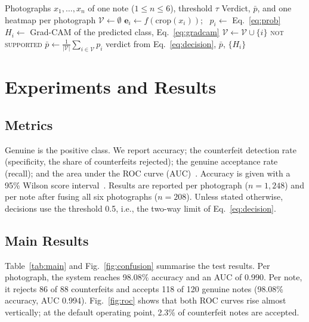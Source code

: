 \documentclass[journal]{IEEEtran}
\begin{document}
\begin{algorithm}[!t]
\caption{Authentication of One Banknote}
\label{alg:inference}
\begin{algorithmic}[1]
\Require Photographs $x_1,\dots,x_n$ of one note ($1\le n\le6$), threshold $\tau$
\Ensure Verdict, $\bar{p}$, and one heatmap per photograph
\State $\mathcal{V}\gets\emptyset$
  \State $\mathbf{e}_i\gets f(\mathrm{crop}(x_i))$; \ $p_i\gets$ Eq.~\eqref{eq:prob}
  \State $H_i\gets$ Grad-CAM of the predicted class, Eq.~\eqref{eq:gradcam}
    \State $\mathcal{V}\gets\mathcal{V}\cup\{i\}$
  \EndIf
\EndFor
{}
  \State \Return \textsc{not supported}
\EndIf
\State $\bar{p}\gets\frac{1}{|\mathcal{V}|}\sum_{i\in\mathcal{V}}p_i$
\State \Return verdict from Eq.~\eqref{eq:decision}, $\bar{p}$, $\{H_i\}$
\end{algorithmic}
\end{algorithm}

\section{Experiments and Results}
\label{sec:results}

\subsection{Metrics}
Genuine is the positive class. We report accuracy; the counterfeit detection rate
(specificity, the share of counterfeits rejected); the genuine acceptance rate (recall);
and the area under the ROC curve (AUC)~\cite{fawcett2006roc}. Accuracy is given with a
95\% Wilson score interval~\cite{wilson1927probable}. Results are reported per photograph
($n=1{,}248$) and per note after fusing all six photographs ($n=208$). Unless stated
otherwise, decisions use the threshold 0.5, i.e., the two-way limit of
Eq.~\eqref{eq:decision}.

\subsection{Main Results}
Table~\ref{tab:main} and Fig.~\ref{fig:confusion} summarise the test results. Per
photograph, the system reaches 98.08\% accuracy and an AUC of 0.990. Per note, it rejects
86 of 88 counterfeits and accepts 118 of 120 genuine notes (98.08\% accuracy, AUC 0.994).
Fig.~\ref{fig:roc} shows that both ROC curves rise almost vertically; at the default
operating point, 2.3\% of counterfeit notes are accepted.
\end{document}
